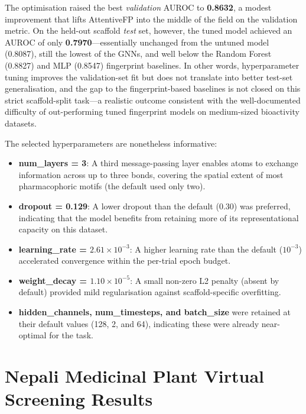 The optimisation raised the best \emph{validation} AUROC to \textbf{0.8632}, a
modest improvement that lifts AttentiveFP into the middle of the field on the
validation metric. On the held-out scaffold \emph{test} set, however, the tuned model
achieved an AUROC of only \textbf{0.7970}---essentially unchanged from the untuned
model (0.8087), still the lowest of the GNNs, and well below the Random Forest
(0.8827) and MLP (0.8547) fingerprint baselines. In other words, hyperparameter
tuning improves the validation-set fit but does not translate into better test-set
generalisation, and the gap to the fingerprint-based baselines is not closed on this
strict scaffold-split task---a realistic outcome consistent with the well-documented
difficulty of out-performing tuned fingerprint models on medium-sized bioactivity
datasets.

The selected hyperparameters are nonetheless informative:

\begin{itemize}
    \item \textbf{num\_layers = 3}: A third message-passing layer enables atoms to
          exchange information across up to three bonds, covering the spatial extent
          of most pharmacophoric motifs (the default used only two).
    \item \textbf{dropout = 0.129}: A lower dropout than the default (0.30) was
          preferred, indicating that the model benefits from retaining more of its
          representational capacity on this dataset.
    \item \textbf{learning\_rate = $2.61 \times 10^{-3}$}: A higher learning rate
          than the default ($10^{-3}$) accelerated convergence within the per-trial
          epoch budget.
    \item \textbf{weight\_decay = $1.10 \times 10^{-5}$}: A small non-zero L2 penalty
          (absent by default) provided mild regularisation against scaffold-specific
          overfitting.
    \item \textbf{hidden\_channels, num\_timesteps, and batch\_size} were retained at
          their default values (128, 2, and 64), indicating these were already
          near-optimal for the task.
\end{itemize}

\section{Nepali Medicinal Plant Virtual Screening Results}
\label{sec:vs_results}

